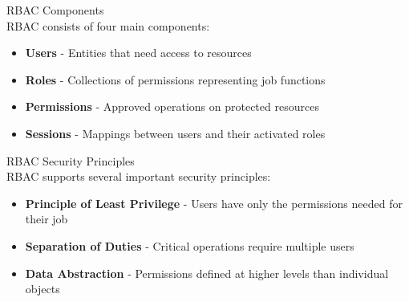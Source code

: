\begin{concept}{RBAC Components}\\
RBAC consists of four main components:
\begin{itemize}
    \item \textbf{Users} - Entities that need access to resources
    \item \textbf{Roles} - Collections of permissions representing job functions
    \item \textbf{Permissions} - Approved operations on protected resources
    \item \textbf{Sessions} - Mappings between users and their activated roles
\end{itemize}
\end{concept}

\begin{theorem}{RBAC Security Principles}\\
RBAC supports several important security principles:
\begin{itemize}
    \item \textbf{Principle of Least Privilege} - Users have only the permissions needed for their job
    \item \textbf{Separation of Duties} - Critical operations require multiple users
    \item \textbf{Data Abstraction} - Permissions defined at higher levels than individual objects
\end{itemize}
\end{theorem}

